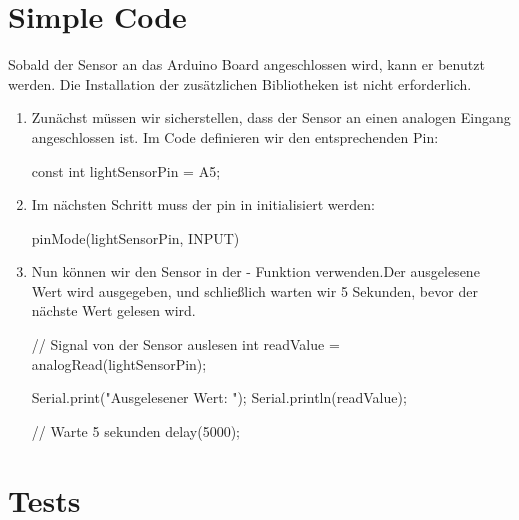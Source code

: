 \section{Simple Code}

Sobald der Sensor an das Arduino Board angeschlossen wird, kann er benutzt werden. Die Installation der zusätzlichen Bibliotheken ist nicht erforderlich.

\begin{enumerate}
	\item  Zunächst müssen wir sicherstellen, dass der Sensor an einen analogen Eingang angeschlossen ist. Im Code definieren wir den entsprechenden Pin:
	
	{
		\begin{Arduino}
			const int lightSensorPin = A5;
		\end{Arduino}
	}
	\item Im nächsten Schritt muss der pin in  initialisiert werden:
	
	{
		\begin{Arduino}
			pinMode(lightSensorPin, INPUT)   
		\end{Arduino}
	}
	\item Nun können wir den Sensor in der  - Funktion verwenden.Der ausgelesene Wert wird ausgegeben, und schließlich warten wir 5 Sekunden, bevor der nächste Wert gelesen wird.
	
	{
		\begin{Arduino}
			// Signal von der Sensor auslesen        
			int readValue = analogRead(lightSensorPin);
			
			Serial.print("Ausgelesener Wert: ");
			Serial.println(readValue);
			
			// Warte 5 sekunden
			delay(5000);
		\end{Arduino}
	}
	
\end{enumerate}





\section{Tests}

